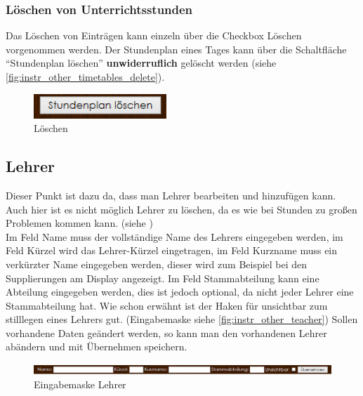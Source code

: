 \subsubsection{Löschen von Unterrichtsstunden}
Das Löschen von Einträgen kann einzeln über die Checkbox Löschen vorgenommen werden. Der Stundenplan eines Tages kann über die Schaltfläche \enquote{Stundenplan löschen} \textbf{unwiderruflich} gelöscht werden (siehe \autoref{fig:instr_other_timetables_delete}).
\begin{figure}[H]
\centering
\includegraphics[keepaspectratio=true, width=5cm]{images/screenshots/timetables_input_delete.png}
\caption{Löschen}
\label{fig:instr_other_timetables_delete}
\end{figure}
\subsection{Lehrer}
Dieser Punkt ist dazu da, dass man Lehrer bearbeiten und hinzufügen kann. Auch hier ist es nicht möglich Lehrer zu löschen, da es wie bei Stunden zu großen Problemen kommen kann. (siehe )\\
Im Feld Name muss der vollständige Name des Lehrers eingegeben werden, im Feld Kürzel wird das Lehrer-Kürzel eingetragen, im Feld Kurzname muss ein verkürzter Name eingegeben werden, dieser wird zum Beispiel bei den Supplierungen am Display angezeigt. Im Feld Stammabteilung kann eine Abteilung eingegeben werden, dies ist jedoch optional, da nicht jeder Lehrer eine Stammabteilung hat. Wie schon erwähnt ist der Haken für unsichtbar zum stilllegen eines Lehrers gut. (Eingabemaske siehe \autoref{fig:instr_other_teacher}) Sollen vorhandene Daten geändert werden, so kann man den vorhandenen Lehrer abändern und mit Übernehmen speichern.
\begin{figure}[H]
\centering
\includegraphics[keepaspectratio=true, width=14cm]{images/screenshots/teachers_input.png}
\caption{Eingabemaske Lehrer}
\label{fig:instr_other_teacher}
\end{figure}
